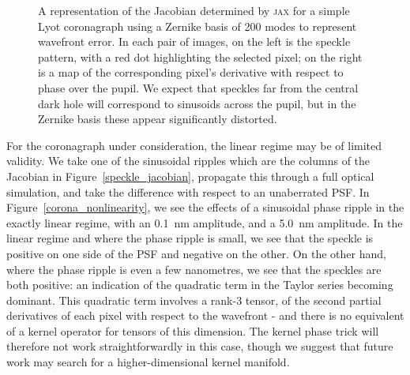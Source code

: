 \documentclass[modern]{aastex63}
\begin{document}

\begin{figure}
\caption{A representation of the Jacobian determined by \textsc{jax} for a simple Lyot coronagraph using a Zernike basis of 200 modes to represent wavefront error. In each pair of images, on the left is the speckle pattern, with a red dot highlighting the selected pixel; on the right is a map of the corresponding pixel's derivative with respect to phase over the pupil. We expect that speckles far from the central dark hole will correspond to sinusoids across the pupil, but in the Zernike basis these appear significantly distorted. \label{speckle_jacobian_zernike}}
\end{figure}

For the coronagraph under consideration, the linear regime may be of limited validity. We take one of the sinusoidal ripples which are the columns of the Jacobian in Figure~\ref{speckle_jacobian}, propagate this through a full optical simulation, and take the difference with respect to an unaberrated PSF. In Figure~\ref{corona_nonlinearity}, we see the effects of a sinusoidal phase ripple in the exactly linear regime, with an 0.1~nm amplitude, and a 5.0~nm amplitude. In the linear regime and where the phase ripple is small, we see that the speckle is positive on one side of the PSF and negative on the other. On the other hand, where the phase ripple is even a few nanometres, we see that the speckles are both positive: an indication of the quadratic term in the Taylor series becoming dominant. This quadratic term involves a rank-3 tensor, of the second partial derivatives of each pixel with respect to the wavefront - and there is no equivalent of a kernel operator for tensors of this dimension. The kernel phase trick will therefore not work straightforwardly in this case, though we suggest that future work may search for a higher-dimensional kernel manifold. 
\end{document}
